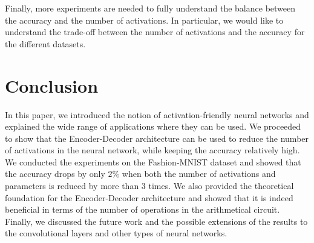 \documentclass{iacrtrans}
\begin{document}
Finally, more experiments are needed to fully understand the balance between the
accuracy and the number of activations. In particular, we would like to
understand the trade-off between the number of activations and the accuracy for
the different datasets.

\section{Conclusion}\label{section:conclusion}

In this paper, we introduced the notion of activation-friendly neural networks
and explained the wide range of applications where they can be used. We
proceeded to show that the Encoder-Decoder architecture can be used to reduce
the number of activations in the neural network, while keeping the accuracy
relatively high. We conducted the experiments on the Fashion-MNIST dataset and
showed that the accuracy drops by only $2\%$ when both the number of activations
and parameters is reduced by more than $3$ times. We also provided the
theoretical foundation for the Encoder-Decoder architecture and showed that it
is indeed beneficial in terms of the number of operations in the arithmetical
circuit. Finally, we discussed the future work and the possible extensions of
the results to the convolutional layers and other types of neural networks.

 
 
\end{document}
